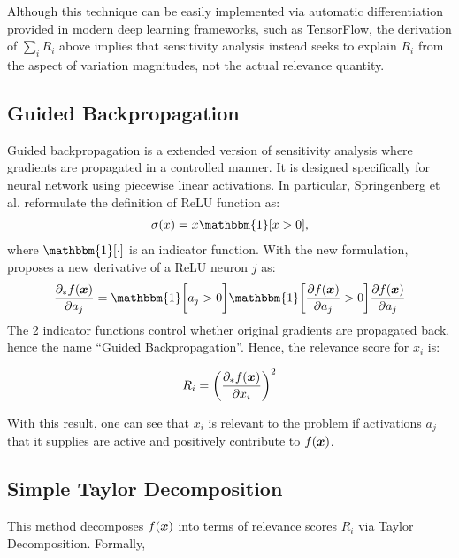 Although this technique can be easily implemented via automatic differentiation provided in modern deep learning frameworks, such as TensorFlow\cite{AbadiTensorFlowLargeScaleMachine2016}, the derivation of $\sum_i R_i$ above implies that sensitivity analysis instead seeks to explain $R_i$ from the aspect of variation magnitudes, not the actual relevance quantity.

\subsection{Guided Backpropagation}
Guided backpropagation is a extended version of sensitivity analysis where gradients are propagated in a controlled manner. It is designed specifically for neural network using piecewise linear activations. In particular, Springenberg et al.\cite{SpringenbergStrivingSimplicityAll2014e} reformulate the definition  of ReLU function as:
\begin{align*}
	\sigma(x) = x \mathbbm{1}[ x > 0 ],
\end{align*}
where $\mathbbm{1}[ \cdot ]$  is an indicator function. With the new formulation, \cite{SpringenbergStrivingSimplicityAll2014e} proposes a new derivative of a ReLU neuron $j$ as:
\begin{align*}
	\frac{\partial_* f(\patvector{x}) }{ \partial a_j } = \mathbbm{1}\bigg[a_j > 0 \bigg] \mathbbm{1}\bigg[ \frac{ \partial f(\patvector{x}) }{ \partial a_j } > 0 \bigg] \frac{ \partial f(\patvector{x}) }{ \partial a_j } 
\end{align*}
The 2 indicator functions control whether original gradients are propagated back, hence the name ``Guided Backpropagation''. Hence, the relevance score for $x_i$ is:

\begin{align*}
	R_i = \bigg( \frac{ \partial_* f(\patvector{x}) }{ \partial x_i }  \bigg)^2
\end{align*}

With this result, one can see that $x_i$ is relevant to the problem if activations $a_j$ that it supplies are active and positively contribute to $f(\patvector{x})$.


\subsection{Simple Taylor Decomposition}
This method decomposes $f(\patvector{x})$ into terms of relevance scores $R_i$ via Taylor Decomposition. Formally, 


